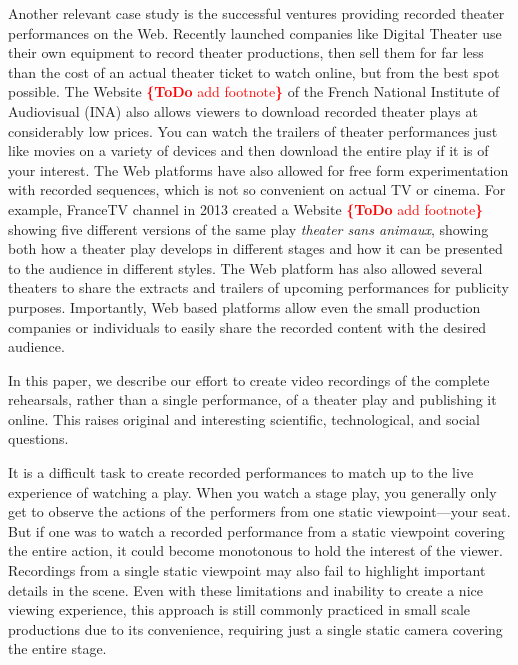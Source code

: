 \documentclass[conference]{IEEEtran}
\newcommand{\todo}[1]{\noindent\textcolor{red}{{\bf \{ToDo} #1{\bf \}}}}
\begin{document}
Another relevant case study  is the successful ventures providing recorded
theater performances on the Web. Recently launched companies like Digital Theater use their
own equipment to record theater productions, then sell them for far less than the cost of an
actual theater ticket to watch online, but from the best spot possible. The Website \todo{add footnote} of the French
National Institute of Audiovisual (INA) also allows viewers to download recorded theater plays
at considerably low prices. You can watch the trailers of theater performances just like movies
on a variety of devices and then download the entire play if it is of your interest. The Web platforms
have also allowed for free form experimentation with recorded sequences, which is not
so convenient on actual TV or cinema. For example, FranceTV channel in 2013 created a Website
\todo{add footnote} showing five different versions of the same play \emph{theater sans animaux}, showing both
how a theater play develops in different stages and how it can be presented to the audience in
different styles. The Web platform has also allowed several theaters to share the extracts and
trailers of upcoming performances for publicity purposes. Importantly, Web based platforms
allow even the small production companies or individuals to easily share the recorded content
with the desired audience.

In this paper, we describe our effort to create video recordings of the complete rehearsals,
rather than a single performance, of a theater play and publishing it online. This raises original
and interesting scientific, technological, and social questions.

It is a difficult task to create recorded performances to match up to the live experience
of watching a play. When you watch a stage play, you generally only get to observe the actions 
of the performers from one static viewpoint---your seat. But if one was to watch a recorded 
performance from a static viewpoint covering the entire action, it could become monotonous 
to hold the interest of the viewer. Recordings from a single static viewpoint may also fail to 
highlight important details in the scene. Even with these limitations and inability to create a nice 
viewing experience, this approach is still commonly practiced in small scale productions due to 
its convenience, requiring just a single static camera covering the entire stage. 
\end{document}
